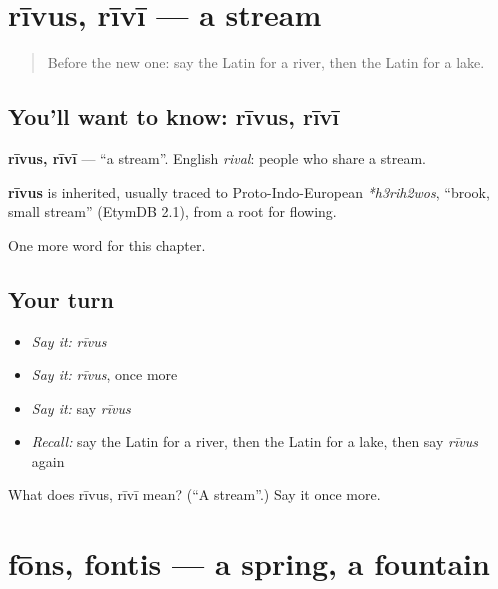 \section[rīvus, rīvī]{rīvus, rīvī — a stream}

\label{lesson:LA-C87-rivus}



\begin{quote}
Before the new one: say the Latin for a river, then the Latin for a lake.
\end{quote}

\subsection*{You'll want to know: rīvus, rīvī}
\textbf{rīvus, rīvī} — \textquotedblleft{}a stream\textquotedblright{}. English \emph{rival}: people who share a stream.

\begin{cousinweb}
\textbf{rīvus} is inherited, usually traced to Proto-Indo-European \emph{*h3rih2wos}, \textquotedblleft{}brook, small stream\textquotedblright{} (EtymDB 2.1), from a root for flowing.
\end{cousinweb}

\begin{grammarlens}[title={What you've built}]
One more word for this chapter.
\end{grammarlens}

\subsection*{Your turn}
\begin{itemize}
\raggedright
  \item \emph{Say it:} \emph{rīvus}
  \item \emph{Say it:} \emph{rīvus}, once more
  \item \emph{Say it:} say \emph{rīvus}
  \item \emph{Recall:} say the Latin for a river, then the Latin for a lake, then say \emph{rīvus} again
\end{itemize}

\begin{tcolorbox}[breakable,colback=teal!4,colframe=teal!35!black,title={Before you move on}]
What does rīvus, rīvī mean? (\textquotedblleft{}A stream\textquotedblright{}.) Say it once more.
\end{tcolorbox}
\section[fōns, fontis]{fōns, fontis — a spring, a fountain}

